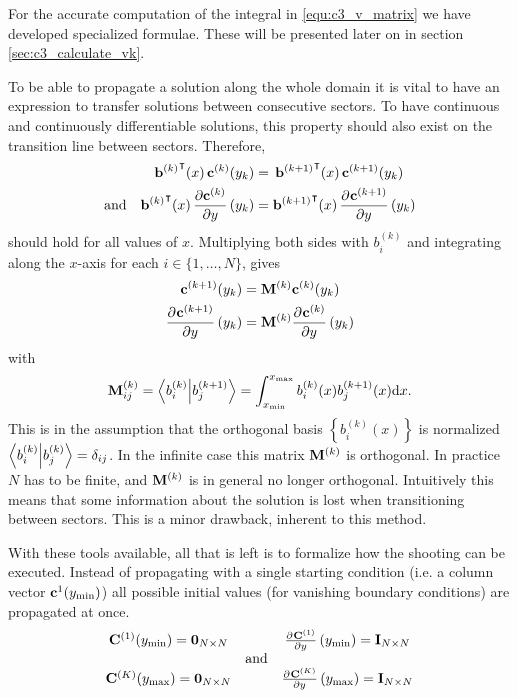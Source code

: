 For the accurate computation of the integral in \eqref{equ:c3_v_matrix} we have developed specialized formulae. These will be presented later on in section \ref{sec:c3_calculate_vk}.

To be able to propagate a solution along the whole domain it is vital to have an expression to transfer solutions between consecutive sectors. To have continuous and continuously differentiable solutions, this property should also exist on the transition line between sectors. Therefore,
\begin{align*}
    {\vb{b}^{(k)}}^\intercal(x) \, \vb{c}^{(k)}(y_k)                   & =\, {\vb{b}^{(k+1)}}^\intercal(x) \, \vb{c}^{(k+1)}(y_k)                   \\
    \text{and}\quad
    {\vb{b}^{(k)}}^\intercal(x)\,\pdv{\vb{c}^{(k)}}{y}\left(y_k\right) & = {\vb{b}^{(k+1)}}^\intercal(x)\,\pdv[]{\vb{c}^{(k+1)}}{y}\left(y_k\right)
\end{align*}
should hold for all values of $x$. Multiplying both sides with $b_i^{(k)}$ and integrating along the $x$-axis for each $i \in \{1, \dots, N\}$, gives
\begin{align*}
    \vb{c}^{(k+1)}(y_k)                       & = \vb{M}^{(k)} \vb{c}^{(k)}(y_k)                       \\
    \pdv[]{\vb{c}^{(k+1)}}{y}\left(y_k\right) & = \vb{M}^{(k)} \pdv[]{\vb{c}^{(k)}}{y}\left(y_k\right)
\end{align*}
with
$$
    \vb{M}^{(k)}_{ij} = \bra{b_{i}^{(k)}}\ket{b_{j}^{(k+1)}} = \int_{x_{\text{min}}}^{x_{\text{max}}} b_i^{(k)}(x) b_j^{(k+1)}(x) \dd x \text{.}
$$
This is in the assumption that the orthogonal basis $\left\{b_i^{(k)}(x)\right\}$ is normalized $\bra{b_{i}^{(k)}}\ket{b_{j}^{(k)}} = \delta_{ij}$. In the infinite case this matrix $\vb{M}^{(k)}$ is orthogonal. In practice $N$ has to be finite, and $\vb{M}^{(k)}$ is in general no longer orthogonal. Intuitively this means that some information about the solution is lost when transitioning between sectors. This is a minor drawback, inherent to this method.

With these tools available, all that is left is to formalize how the shooting can be executed. Instead of propagating with a single starting condition (i.e. a column vector $\vb{c}^{1}({y_{\text{min}}})$) all possible initial values (for vanishing boundary conditions) are propagated at once.
$$
    \begin{matrix}
        \vb{C}^{(1)}({y_{\text{min}}}) = \vb{0}_{N\times N} &            & \pdv[]{\vb{C}^{(1)}}{y}\left({y_{\text{min}}}\right) = \vb{I}_{N\times N} \\
                                                 & \text{and} &                                                                \\
        \vb{C}^{(K)}({y_{\text{max}}}) = \vb{0}_{N\times N} &            & \pdv[]{\vb{C}^{(K)}}{y}\left({y_{\text{max}}}\right) = \vb{I}_{N\times N}
    \end{matrix}
$$

